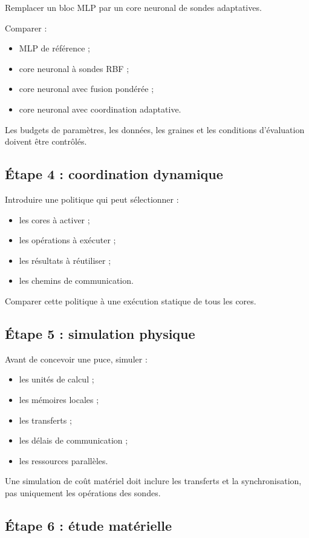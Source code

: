 \documentclass[11pt,a4paper]{article}
\begin{document}
Remplacer un bloc MLP par un core neuronal de sondes adaptatives.

Comparer :
\begin{itemize}
  \item MLP de référence ;
  \item core neuronal à sondes RBF ;
  \item core neuronal avec fusion pondérée ;
  \item core neuronal avec coordination adaptative.
\end{itemize}

Les budgets de paramètres, les données, les graines et les conditions
d'évaluation doivent être contrôlés.

\subsection{Étape 4 : coordination dynamique}

Introduire une politique qui peut sélectionner :
\begin{itemize}
  \item les cores à activer ;
  \item les opérations à exécuter ;
  \item les résultats à réutiliser ;
  \item les chemins de communication.
\end{itemize}

Comparer cette politique à une exécution statique de tous les cores.

\subsection{Étape 5 : simulation physique}

Avant de concevoir une puce, simuler :
\begin{itemize}
  \item les unités de calcul ;
  \item les mémoires locales ;
  \item les transferts ;
  \item les délais de communication ;
  \item les ressources parallèles.
\end{itemize}

Une simulation de coût matériel doit inclure les transferts et
la synchronisation, pas uniquement les opérations des sondes.

\subsection{Étape 6 : étude matérielle}
\end{document}
